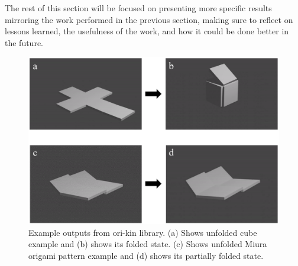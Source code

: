 The rest of this section will be focused on presenting more specific results mirroring the work performed in the previous section, making sure to reflect on lessons learned, the usefulness of the work, and how it could be done better in the future.
\begin{figure}
    \centering
    \includegraphics[width=0.9\linewidth]{Graphics/folding_examples.png}
    \caption{Example outputs from ori-kin library. (a) Shows unfolded cube example and (b) shows its folded state. (c) Shows unfolded Miura origami pattern example and (d) shows its partially folded state.}
    \label{fig:folding_examples}
\end{figure}

